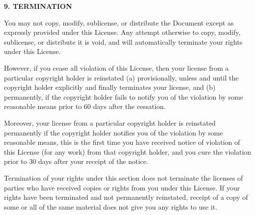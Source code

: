 \fi

\ifdefined\eng
\fi

\ifdefined\chs

\fi

\ifdefined\eng
\begin{center}
{\Large\bf 9. TERMINATION\par}
\end{center}
\fi

\ifdefined\chs

\fi

\ifdefined\eng
\fi

\ifdefined\chs

\fi

\ifdefined\eng
You may not copy, modify, sublicense, or distribute the Document
except as expressly provided under this License.  Any attempt
otherwise to copy, modify, sublicense, or distribute it is void, and
will automatically terminate your rights under this License.
\fi

\ifdefined\chs

\fi

\ifdefined\eng
However, if you cease all violation of this License, then your license
from a particular copyright holder is reinstated (a) provisionally,
unless and until the copyright holder explicitly and finally
terminates your license, and (b) permanently, if the copyright holder
fails to notify you of the violation by some reasonable means prior to
60 days after the cessation.
\fi

\ifdefined\chs

\fi

\ifdefined\eng
Moreover, your license from a particular copyright holder is
reinstated permanently if the copyright holder notifies you of the
violation by some reasonable means, this is the first time you have
received notice of violation of this License (for any work) from that
copyright holder, and you cure the violation prior to 30 days after
your receipt of the notice.
\fi

\ifdefined\chs

\fi

\ifdefined\eng
Termination of your rights under this section does not terminate the
licenses of parties who have received copies or rights from you under
this License.  If your rights have been terminated and not permanently
reinstated, receipt of a copy of some or all of the same material does
not give you any rights to use it.
\fi

\ifdefined\chs

